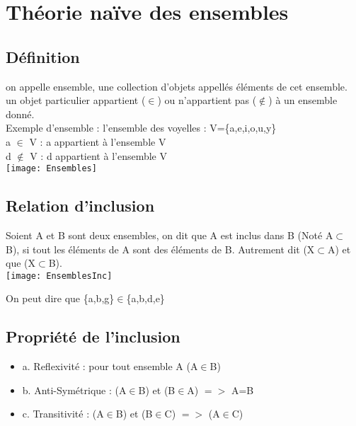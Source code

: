 \newpage

\chapter{Théorie naïve des ensembles}
\vspace{4mm} %

\section{Définition}

on appelle ensemble, une collection d'objets appellés éléments de cet ensemble.\\
un objet particulier appartient ($\in$) ou n'appartient pas ($\notin$) à un ensemble donné.\\

Exemple d'ensemble : l'ensemble des voyelles : V=\{a,e,i,o,u,y\} \\

a $\in$ V : a appartient à l'ensemble V \\
d $\notin$ V : d appartient à l'ensemble V \\

\texttt{[image: Ensembles]}
\vspace{3mm} %

\section{Relation d'inclusion}

Soient A et B sont deux ensembles, on dit que A est inclus dans B (Noté A$\subset$ B), si tout les éléments de A sont des éléments de B.
Autrement dit (X$\subset$A) et que (X$\subset$B).\\

\texttt{[image: EnsemblesInc]}
\vspace{3mm} %

On peut dire que \{a,b,g\}$\in$\{a,b,d,e\} \\

\section{Propriété de l'inclusion}

\begin{itemize}
\item {a. Reflexivité : pour tout ensemble A (A$\in$B)}
\item {b. Anti-Symétrique : (A$\in$B) et (B$\in$A) $=>$ A=B}
\item {c. Transitivité : (A$\in$B) et (B$\in$C) $=>$ (A$\in$C)}
\end{itemize}

